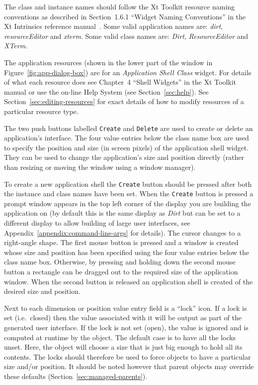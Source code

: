 The class and instance names should follow the Xt Toolkit resource naming
conventions as described in Section~1.6.1 ``Widget Naming Conventions''
in the Xt Intrinsics reference manual~\cite{XtIntrinsics}.
Some valid application names are: {\em dirt}, {\em resourceEditor}
and {\em xterm}.  Some valid class names are: {\em Dirt},
{\em ResourceEditor} and {\em XTerm}.

The application resources (shown in the lower part of the window in
Figure~\ref{fig:app-dialog-box}) are for an
{\em Application Shell Class} widget.
For details of what each resource does see Chapter~4 ``Shell Widgets'' in the
Xt Toolkit manual or use the on-line Help System (see
Section~\ref{sec:help}).
See Section~\ref{sec:editing-resources} for exact details of how to modify
resources of a particular resource type.

The two push buttons labelled {\tt Create} and {\tt Delete} are used to
create or delete an application's interface.
The four value entries
below the class name box are used to specify the position and size (in screen
pixels) of the application shell widget.  They can be used to change the
application's size and position directly (rather than resizing or moving the
window using a window manager).

To create a new application shell the {\tt Create} button should be pressed
after both the instance and class names have been set.  When the {\tt Create}
button is pressed a prompt
window appears in the top left corner of the display you are building the
application on (by default this is the same display as {\em Dirt} but can be
set to a different display to allow building of large user interfaces, see
Appendix~\ref{appendix:command-line-args} for details).  The cursor changes to a
right-angle shape.  The first mouse button is pressed and a window is created
whose size and position has been specified using the four value entries below
the class name box.  Otherwise, by pressing and holding down the second mouse
button a
rectangle can be dragged out to the required size of the application window.
When the second button is released an application shell is created of the
desired size and position.

Next to each dimension or position value entry field is a ``lock'' icon.
If a lock is set (i.e.\ closed) then the value associated with it will be
output as part of the generated user interface.  If the lock is not set
(open), the value is ignored and is computed at runtime by the object.
The default case is to have all the locks unset. Here, the object will
choose a size that is just big enough to hold all its contents. The locks
should therefore be used to force objects to have a particular size
and/or position. It should be noted however that parent objects may override
these defaults (Section~\ref{sec:managed-parents}).

